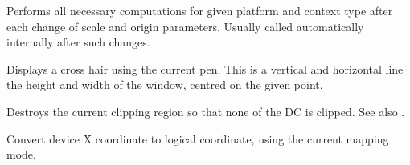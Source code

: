 \begin{comment}

\membersection{wxDC::ClearCache}\label{wxdcclearcache}

\func{static void}{ClearCache}{\void}

On supported platforms (currently only Windows), clears
the contents of the DC cache (one bitmap and two Windows device contexts). The DC cache
can speed up the \helpref{Blit}{wxdcblit} operation when
drawing a large number of masked bitmaps. You should
call ClearCache at the end of length DC operations if you wish to only use
the cache transiently; you should also call it as your application exits.

If using the cache functions in your code, please test for the
wxUSE\_DC\_CACHEING preprocessor symbol for portability.

\wxheading{See also}

\helpref{wxDC::EnableCache}{wxdcenablecache}, \helpref{wxDC::CacheEnabled}
\end{comment}


\label{wxdccomputescaleandorigin}


Performs all necessary computations for given platform and context type
after each change of scale and origin parameters. Usually called automatically 
internally after such changes.


\label{wxdccrosshair}


Displays a cross hair using the current pen. This is a vertical
and horizontal line the height and width of the window, centred
on the given point.


\label{wxdcdestroyclippingregion}


Destroys the current clipping region so that none of the DC is clipped.
See also .


\label{wxdcdevicetologicalx}


Convert device X coordinate to logical coordinate, using the current
mapping mode.


